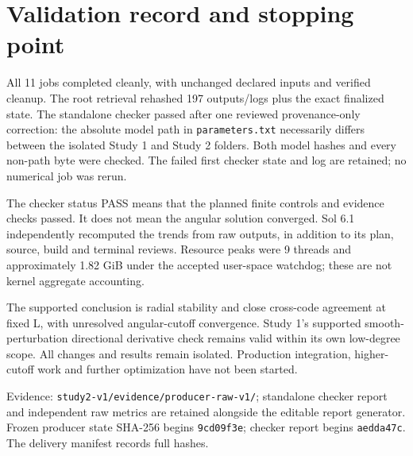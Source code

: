 \documentclass[11pt,a4paper]{article}
\begin{document}
\section{Validation record and stopping point}
All 11 jobs completed cleanly, with unchanged declared inputs and verified cleanup. The root retrieval rehashed 197 outputs/logs plus the exact finalized state. The standalone checker passed after one reviewed provenance-only correction: the absolute model path in \texttt{parameters.txt} necessarily differs between the isolated Study 1 and Study 2 folders. Both model hashes and every non-path byte were checked. The failed first checker state and log are retained; no numerical job was rerun.

The checker status PASS means that the planned finite controls and evidence checks passed. It does not mean the angular solution converged. Sol 6.1 independently recomputed the trends from raw outputs, in addition to its plan, source, build and terminal reviews. Resource peaks were 9 threads and approximately 1.82 GiB under the accepted user-space watchdog; these are not kernel aggregate accounting.

The supported conclusion is radial stability and close cross-code agreement at fixed L, with unresolved angular-cutoff convergence. Study 1's supported smooth-perturbation directional derivative check remains valid within its own low-degree scope. All changes and results remain isolated. Production integration, higher-cutoff work and further optimization have not been started.

\medskip\noindent\small Evidence: \texttt{study2-v1/evidence/producer-raw-v1/}; standalone checker report and independent raw metrics are retained alongside the editable report generator. Frozen producer state SHA-256 begins \texttt{9cd09f3e}; checker report begins \texttt{aedda47c}. The delivery manifest records full hashes.
\end{document}

